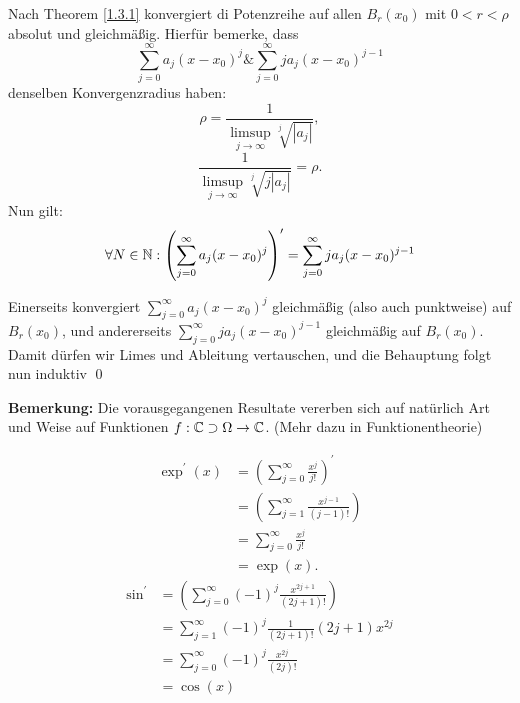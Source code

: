 \begin{subproof*}
	Nach Theorem \ref{1.3.1} konvergiert di Potenzreihe auf allen $ B_{r}(x_0)  $ mit $ 0 < r < \rho $ absolut und gleichmäßig. Hierfür bemerke, dass
	\[
		\sum_{j=0}^{\infty} a_j (x - x_0)^j \& \sum_{j=0}^{\infty} ja_j (x - x_0)^{j-1} 
	\]
	denselben Konvergenzradius haben:
	\[
		\rho = \frac{ 1 }{ \limsup_{j \to \infty} \sqrt[j]{\left| a_j \right| }  },
	\]
	\[
		\frac{ 1 }{ \limsup_{j \to \infty} \sqrt[j]{j \left| a_j \right| }  } = \rho.
	\]
	Nun gilt:
	\[
		\forall N \in \mathbb{N} : \left( \sum_{j=0}^{\infty} a_j (x - x_0)^j  \right) ^\prime = \sum_{j=0}^{\infty} ja_j (x - x_0)^{j - 1} 
	\]
	
	Einerseits konvergiert $ \sum_{j=0}^{\infty} a_j (x - x_0)^j  $ gleichmäßig (also auch punktweise) auf $ B_{r}(x_0)  $, und andererseits $ \sum_{j=0}^{\infty} ja_j (x - x_0)^{j - 1}   $ gleichmäßig auf $ B_{r}(x_0)  $.
	Damit dürfen wir Limes und Ableitung vertauschen, und die Behauptung folgt nun induktiv \qed
\end{subproof*}

\textbf{Bemerkung:} Die vorausgegangenen Resultate vererben sich auf natürlich Art und Weise auf Funktionen $ f: \mathbb{C} \supset \Omega \to \mathbb{C}  $. (Mehr dazu in Funktionentheorie)

\begin{subexample}[$ \exp, \sin, \cos $]
	\begin{align*}
		\exp ^\prime (x) &= \left( \sum_{j=0}^{\infty} \frac{ x^j }{ j! }  \right) ^\prime \\
		~&= \left( \sum_{j=1}^{\infty} \frac{ x^{j - 1} }{ (j - 1)! } \right) \\
		~&= \sum_{j=0}^{\infty} \frac{x^j}{ j! }  \\
		~&= \exp (x).
	\end{align*}
	\begin{align*}
		\sin ^\prime &= \left( \sum_{j=0}^{\infty} (-1)^j \frac{ x^{2j + 1} }{ (2j + 1)! }  \right)  \\
		~&= \sum_{j=1}^{\infty} (-1)^j \frac{ 1 }{ (2j + 1)! } (2j + 1) x^{2j}  \\
		~&= \sum_{j=0}^{\infty} (-1)^j \frac{ x^{2j} }{ (2j)!}  \\
		~&= \cos (x)
	\end{align*}
\end{subexample}

